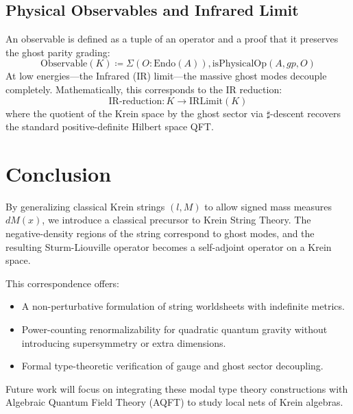 \documentclass{article}
\begin{document}
\subsection{Physical Observables and Infrared Limit}
\label{sec:observables}

An observable is defined as a tuple of an operator and a proof that it preserves the ghost parity grading:
\begin{equation}
    \text{Observable}(K) \coloneqq \Sigma(O : \text{Endo}(A)), \text{isPhysicalOp}(A, gp, O)
\end{equation}
At low energies—the Infrared (IR) limit—the massive ghost modes decouple completely. Mathematically, this corresponds to the IR reduction:
\begin{equation}
    \text{IR-reduction} : K \to \text{IRLimit}(K)
\end{equation}
where the quotient of the Krein space by the ghost sector via $\sharp$-descent recovers the standard positive-definite Hilbert space QFT.

\section{Conclusion}
\label{sec:conclusion}

By generalizing classical Krein strings $(l, M)$ to allow signed mass measures $dM(x)$, we introduce a classical precursor to Krein String Theory. The negative-density regions of the string correspond to ghost modes, and the resulting Sturm-Liouville operator becomes a self-adjoint operator on a Krein space.

This correspondence offers:
\begin{itemize}
    \item A non-perturbative formulation of string worldsheets with indefinite metrics.
    \item Power-counting renormalizability for quadratic quantum gravity without introducing supersymmetry or extra dimensions.
    \item Formal type-theoretic verification of gauge and ghost sector decoupling.
\end{itemize}
Future work will focus on integrating these modal type theory constructions with Algebraic Quantum Field Theory (AQFT) to study local nets of Krein algebras.
\end{document}

